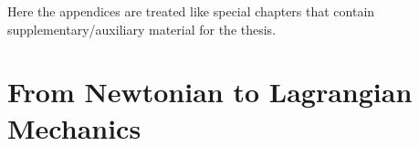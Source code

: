 \documentclass[12pt,titlepage,oneside]{book}
\newcommand{\tcg}[1]{\textcolor{GRASSGREEN}{#1}} %
\begin{document}
\begin{appendices}
\tcg{Here the appendices are treated like special chapters that contain supplementary/auxiliary material for the thesis.}

\chapter{From Newtonian to Lagrangian\\ Mechanics}
\label{app:C2L}
%

\end{appendices}
\backmatter  %

\begingroup
\raggedright
\sloppy
\printbibliography
\endgroup
\end{document}

